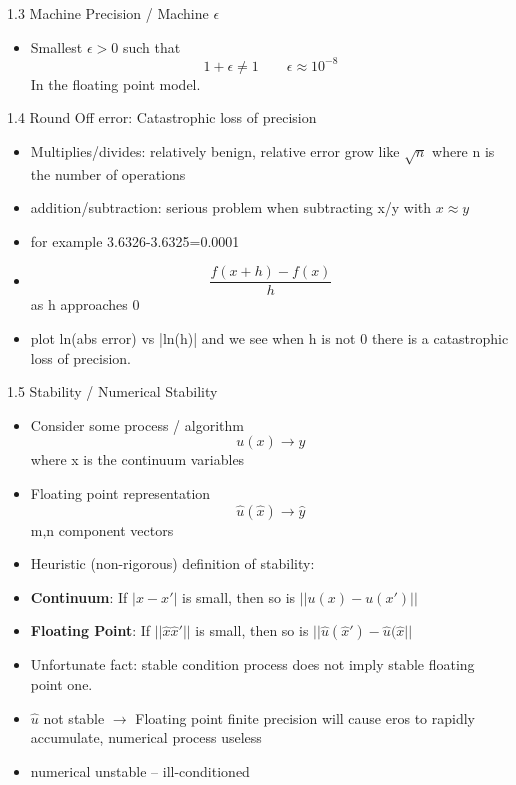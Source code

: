 1.3 Machine Precision / Machine $\epsilon$

\begin{itemize}
    \item Smallest $\epsilon > 0$ such that
    \[1+\epsilon \neq 1 \qquad \epsilon \approx 10^{-8}\]
    In the floating point model.
\end{itemize}


1.4 Round Off error: Catastrophic loss of precision

\begin{itemize}
    \item Multiplies/divides: relatively benign, relative error grow like $\sqrt{n}$ where n is the number of operations
    \item addition/subtraction: serious problem when subtracting x/y with $x\approx y$
    \item for example 3.6326-3.6325=0.0001
    \item \[\frac{f(x+h)-f(x)}{h}\] as h approaches 0
    \item plot ln(abs error) vs |ln(h)| and we see when h is not 0 there is a catastrophic loss of precision.
\end{itemize}

1.5 Stability / Numerical Stability
\begin{itemize}
    \item Consider some process / algorithm
    \[u(x) \rightarrow y\]
    where x is the continuum variables
    \item Floating point representation
    \[\hat{u}(\hat{x}) \rightarrow \hat{y}\]
    m,n component vectors

    \item Heuristic (non-rigorous) definition of stability:

    \item \textbf{Continuum}: If $|{x-x'}|$ is small, then so is $||u(x)-u(x')||$

    \item \textbf{Floating Point}: If $||\hat{x}\hat{x}'||$ is small, then so is $||\hat{u}(\hat{x}')-\hat{u}(\hat{x}||$

    \item Unfortunate fact: stable condition process does not imply stable floating point one.

    \item $\hat{u}$ not stable $\rightarrow$ Floating point finite precision will cause eros to rapidly accumulate, numerical process useless

    \item numerical unstable -- ill-conditioned
\end{itemize}
